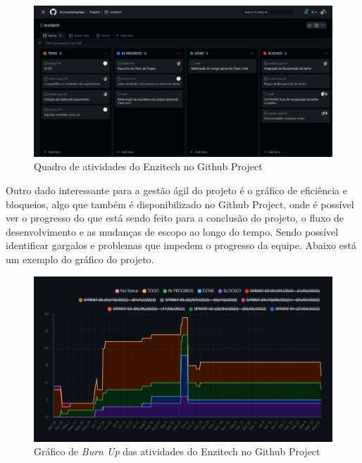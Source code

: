 \begin{figure}[H]
\centering
  \includegraphics[width=\columnwidth]{images/quadro_projeto_github.png}
  \caption{Quadro de atividades do Enzitech no Github Project}
  \label{fig:quadro_projeto_github}
\end{figure}

Outro dado interessante para a gestão ágil do projeto é o gráfico de eficiência e bloqueios, algo que também é disponibilizado no Github Project, onde é possível ver o progresso do que está sendo feito para a conclusão do projeto, o fluxo de desenvolvimento e as mudanças de escopo ao longo do tempo. Sendo possível identificar gargalos e problemas que impedem o progresso da equipe. Abaixo está um exemplo do gráfico do projeto.

\begin{figure}[H]
\centering
  \includegraphics[width=\columnwidth]{images/grafico_projeto_github.png}
  \caption{Gráfico de \textit{Burn Up} das atividades do Enzitech no Github Project}
  \label{fig:grafico_projeto_github}
\end{figure}

